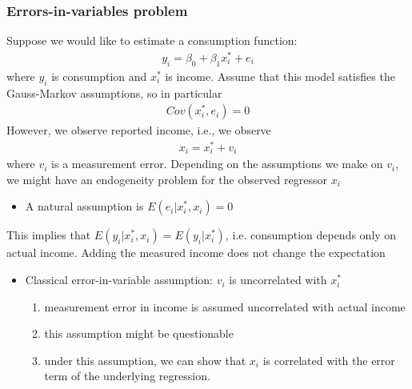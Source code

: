 \documentclass[a4paper,twoside,11pt]{article}
\begin{document}
\subsubsection{Errors-in-variables problem}
Suppose we would like to estimate a consumption function:
\begin{equation*}
\begin{aligned}
y_i = \beta_0 + \beta_1 x_i^* + e_i
\end{aligned} 
\end{equation*}
where $y_i$ is consumption and $x_i^*$ is income. Assume that this model satisfies the Gauss-Markov assumptions, so in particular
\begin{equation*}
\begin{aligned}
Cov(x_i^*, e_i) =0
\end{aligned} 
\end{equation*}
However, we observe reported income, i.e., we observe
\begin{equation*}
\begin{aligned}
x_i = x_i^* + v_i
\end{aligned} 
\end{equation*}
where $v_i$ is a measurement error.
\newline
\textcolor{NavyBlue}{Depending on the assumptions we make on $v_i$, we might have an endogeneity problem for the observed regressor $x_i$}
\begin{itemize}
    \item A natural assumption is $E(e_i|x_i^*,x_i)=0$
\end{itemize}
This implies that $E(y_i|x_i^*,x_i)=E(y_i|x_i^*)$, i.e. consumption depends only on actual income. Adding the measured income does not change the expectation
\begin{itemize}
    \item Classical error-in-variable assumption: $v_i$ is uncorrelated with $x_i^*$
    \begin{enumerate}
        \item measurement error in income is assumed uncorrelated with actual income
        \item this assumption might be questionable
        \item under this assumption, we can show that $x_i$ is correlated with the error term of the underlying regression.
    \end{enumerate}
\end{itemize}
\end{document}
